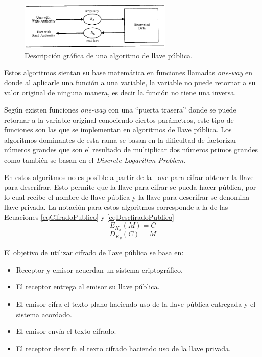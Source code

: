 \begin{figure}
	\centering
	\includegraphics[width=0.65\textwidth]{./images/figPublicKeyAlgorithm}
	\caption{Descripción gráfica de una algoritmo de llave pública.}
	\label{figPublicKeyAlgorithm}
\end{figure}

Estos algoritmos sientan su base matemática en funciones llamadas \textit{one-way} en donde al aplicarle una función a una variable, la variable no puede retornar a su valor original de ninguna manera, es decir la función no tiene una inversa. 

Según \cite{bruce} existen funciones \textit{one-way} con una ``puerta trasera'' donde se puede retornar a la variable original conociendo ciertos parámetros, este tipo de funciones son las que se implementan en algoritmos de llave pública. Los algoritmos dominantes de esta rama se basan en la dificultad de factorizar números grandes que son el resultado de multiplicar dos números primos grandes como también se basan en el \textit{Discrete Logarithm Problem}.

En estos algoritmos no es posible a partir de la llave para cifrar obtener la llave para descrifrar. Esto permite que la llave para cifrar se pueda hacer pública, por lo cual recibe el nombre de llave pública y la llave para descrifrar se denomina llave privada. La notación para estos algoritmos corresponde a la de las Ecuaciones \eqref{eqCifradoPublico} y \eqref{eqDescfiradoPublico}
\begin{equation} \label{eqCifradoPublico}
E_{K_x} (M) = C
\end{equation}
\begin{equation} \label{eqDescfiradoPublico}
D_{K_y} (C) = M
\end{equation}

El objetivo de utilizar cifrado de llave pública se basa en:
\begin{itemize}
\item Receptor y emisor acuerdan un sistema criptográfico.
\item El receptor entrega al emisor su llave pública.
\item El emisor cifra el texto plano haciendo uso de la llave pública entregada y el sistema acordado.
\item El emisor envía el texto cifrado.
\item El receptor descrifa el texto cifrado haciendo uso de la llave privada.
\end{itemize}

